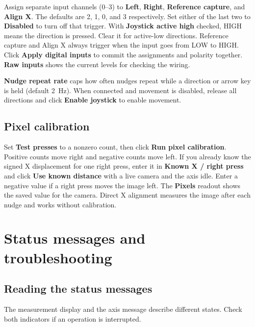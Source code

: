 \documentclass[a4paper,11pt]{article}
\begin{document}
Assign separate input channels (0--3) to \textbf{Left}, \textbf{Right},
\textbf{Reference capture}, and \textbf{Align X}. The defaults are 2, 1, 0,
and 3 respectively. Set either of the last two to \textbf{Disabled} to turn
off that trigger. With \textbf{Joystick active high} checked, HIGH means the
direction is pressed. Clear it for active-low directions. Reference capture
and Align X always trigger when the input goes from LOW to HIGH.
Click \textbf{Apply digital inputs} to commit the assignments and polarity
together. \textbf{Raw inputs} shows the current levels for checking the wiring.

\textbf{Nudge repeat rate} caps how often nudges repeat while a direction or
arrow key is held (default 2~Hz). When connected and movement is disabled,
release all directions and click \textbf{Enable joystick} to enable movement.

\subsection{Pixel calibration}

Set \textbf{Test presses} to a nonzero count, then click \textbf{Run pixel calibration}. Positive counts move right and negative counts move left.
If you already know the signed X displacement for one right press, enter it in
\textbf{Known X / right press} and click \textbf{Use known distance} with a live
camera and the axis idle. Enter a negative value if a right press moves the image
left. The \textbf{Pixels} readout shows the saved value for the camera. Direct
X alignment measures the image after each nudge and works without calibration.

\newpage
\section{Status messages and troubleshooting}

\subsection{Reading the status messages}

The measurement display and the axis message describe different states.
Check both indicators if an operation is interrupted.
\end{document}
